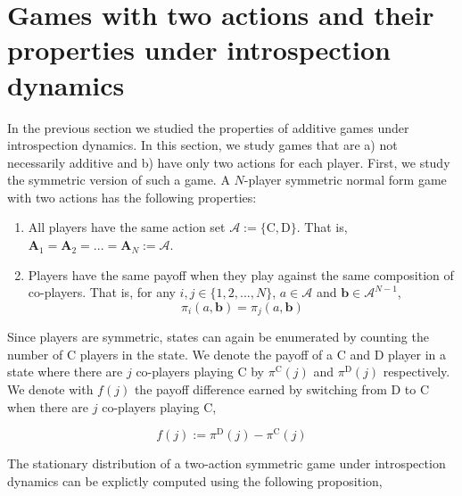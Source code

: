 \documentclass[11pt]{article}
\theoremstyle{plainCl1}
\theoremstyle{plainCl2}
\newcommand{\A}{\mathbf{A}}
\newcommand{\abf}{\mathbf{a}}
\newcommand{\bbf}{\mathbf{b}}
\newcommand{\C}{\mathrm{C}}
\newcommand{\D}{\mathrm{D}}
\begin{document}
\section{Games with two actions and their properties under introspection dynamics}

In the previous section we studied the properties of additive games under introspection dynamics. In this section, we study games that are a) not necessarily additive and b) have only two actions for each player. First, we study the symmetric version of such a game. A $N$-player symmetric normal form game with two actions has the following properties:

\begin{enumerate}
\item  All players have the same action set $\mathcal{A} := \{\C,\D\}$. That is, $\A_1 = \A_2 = ... = \A_N := \mathcal{A}$. 
\item Players have the same payoff when they play against the same composition of co-players. That is, for any $i,j \in \{1,2,...,N\}$, $a \in \mathcal{A}$ and $\bbf \in \mathcal{A}^{N-1}$,
\begin{equation}
\pi_i(a,\bbf) = \pi_j(a,\bbf)
\end{equation} 
\end{enumerate}

\noindent Since players are symmetric, states can again be enumerated by counting the number of $\C$ players in the state. We denote the payoff of a $\C$ and $\D$ player in a state where there are $j$ co-players playing $\C$ by $\pi^\C(j)$ and $\pi^\D(j)$ respectively. We denote with $f(j)$ the payoff difference earned by switching from $\D$ to $\C$ when there are $j$ co-players playing $\C$, 

\begin{equation}
f(j) := \pi^\D(j) - \pi^\C(j)
\label{Eq:f-switching-CtoD}
\end{equation}

%
\noindent The stationary distribution of a two-action symmetric game under introspection dynamics can be explictly computed using the following proposition, 
\end{document}
